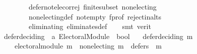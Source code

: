 \begin{isabellebody}
\ \ \ \ \ \ \ \ defer{\isacharunderscore}{\kern0pt}not{\isacharunderscore}{\kern0pt}elec{\isacharunderscore}{\kern0pt}or{\isacharunderscore}{\kern0pt}rej\ finite{\isacharunderscore}{\kern0pt}subset\ non{\isacharunderscore}{\kern0pt}electing\isanewline
\ \ \ \ \ \ \ \ non{\isacharunderscore}{\kern0pt}electing{\isacharunderscore}{\kern0pt}def\ not{\isacharunderscore}{\kern0pt}empty\ f{\isacharunderscore}{\kern0pt}prof\ reject{\isacharunderscore}{\kern0pt}in{\isacharunderscore}{\kern0pt}alts\isanewline
\ \ \ \ \ \ \ \ eliminating\ eliminates{\isacharunderscore}{\kern0pt}def\isanewline
\ \ \isamarkupfalse%
\ {\isacharparenleft}{\kern0pt}smt\ {\isacharparenleft}{\kern0pt}verit{\isacharparenright}{\kern0pt}{\isacharparenright}{\kern0pt}%
\endisatagproof
{\isafoldproof}%
%
\isadelimproof
\isanewline
%
\endisadelimproof
\isanewline
\isanewline
{}\isamarkupfalse%
\ defer{\isacharunderscore}{\kern0pt}deciding\ {\isacharcolon}{\kern0pt}{\isacharcolon}{\kern0pt}\ {\isachardoublequoteopen}{\isacharprime}{\kern0pt}a\ Electoral{\isacharunderscore}{\kern0pt}Module\ {\isasymRightarrow}\ bool{\isachardoublequoteclose}\ \isanewline
\ \ {\isachardoublequoteopen}defer{\isacharunderscore}{\kern0pt}deciding\ m\ {\isasymequiv}\isanewline
\ \ \ \ electoral{\isacharunderscore}{\kern0pt}module\ m\ {\isasymand}\ non{\isacharunderscore}{\kern0pt}electing\ m\ {\isasymand}\ defers\ {}\ m{\isachardoublequoteclose}\isanewline
%
\isadelimtheory
\isanewline
%
\endisadelimtheory
%
\isatagtheory
{}\isamarkupfalse%
%
\endisatagtheory
{\isafoldtheory}%
%
\isadelimtheory
%
\endisadelimtheory
%
\end{isabellebody}%
\endinput
